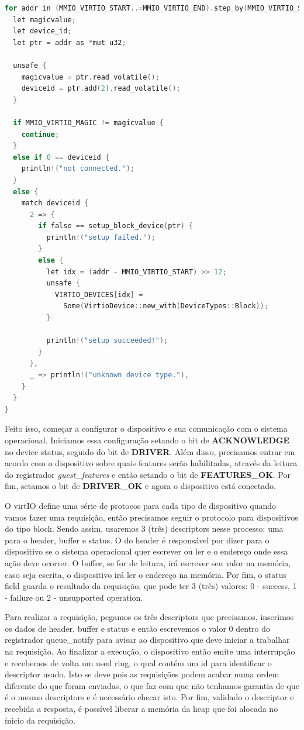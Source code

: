 \begin{lstlisting}[language=C]
for addr in (MMIO_VIRTIO_START..=MMIO_VIRTIO_END).step_by(MMIO_VIRTIO_STRIDE) {
  let magicvalue;
  let device_id;
  let ptr = addr as *mut u32;

  unsafe {
    magicvalue = ptr.read_volatile();
    deviceid = ptr.add(2).read_volatile();
  }

  if MMIO_VIRTIO_MAGIC != magicvalue {
    continue;
  }
  else if 0 == deviceid {
    println!("not connected.");
  }
  else {
    match deviceid {
      2 => {
        if false == setup_block_device(ptr) {
          println!("setup failed.");
        }
        else {
          let idx = (addr - MMIO_VIRTIO_START) >> 12;
          unsafe {
            VIRTIO_DEVICES[idx] =
              Some(VirtioDevice::new_with(DeviceTypes::Block));
          }

          println!("setup succeeded!");
        }
      },
      _ => println!("unknown device type."),
    }
  }
}
\end{lstlisting}

Feito isso, começar a configurar o dispositivo e sua comunicação com o sistema operacional. Iniciamos essa configuração setando o bit de \textbf{ACKNOWLEDGE} no device status, seguido do bit de \textbf{DRIVER}.
Além disso, precisamos entrar em acordo com o dispositivo sobre quais features serão habilitadas, através da leitura do registrador \emph{guest{\_}features} e então setando o bit de \textbf{FEATURES{\_}OK}. 
Por fim, setamos o bit de \textbf{DRIVER{\_}OK} e agora o dispositivo está conectado.


O virtIO define uma série de protocos para cada tipo de dispositivo quando vamos fazer uma requisição, então precisamos seguir o protocolo para dispositivos do tipo block.
Sendo assim, usaremos 3 (três) descriptors nesse processo: uma para o header, buffer e status.
O do header é responsável por dizer para o dispositivo se o sistema operacional quer escrever ou ler e o endereço onde essa ação deve ocorrer.
O buffer, se for de leitura, irá escrever seu valor na memória, caso seja escrita, o dispositivo irá ler o endereço na memória.
Por fim, o status field guarda o resultado da requisição, que pode ter 3 (três) valores: 0 - success, 1 - failure ou 2 - unsupported operation.


Para realizar a requisição, pegamos os três descriptors que precisamos, inserimos os dados de header, buffer e status e então escrevemos o valor 0 dentro do registrador queue{\_}notify para avisar ao dispositivo que deve iniciar a trabalhar na requisição.
Ao finalizar a execução, o dispositivo então emite uma interrupção e recebemos de volta um used ring, o qual contém um id para identificar o descriptor usado. Isto se deve pois as requisições podem 
acabar numa ordem diferente do que foram enviadas, o que faz com que não tenhamos garantia de que é o mesmo descriptors e é necessário checar isto.
Por fim, validado o descriptor e recebida a resposta, é possível liberar a memória da heap que foi alocada no ínicio da requisição.